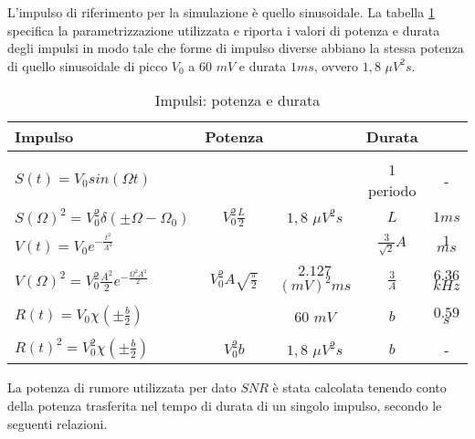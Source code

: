 L'impulso di riferimento per la simulazione è quello sinusoidale.
La tabella \ref{tab:impulsi} specifica la parametrizzazione utilizzata e riporta i valori di potenza e durata degli impulsi in modo tale che forme di impulso diverse abbiano la stessa potenza di quello sinusoidale di picco $V_{0}$ a $60$ $mV$ e durata $1ms$, ovvero $1,8$ $\mu V^{2}s$.


\begin{table}%
\begin{tabular}{l|c|c|c|c|}
{\bf Impulso}   & Potenza &  & Durata &  \\ \hline

& & & &     \\

$S(t)  = V_{0}sin(\Omega t)$
&   & 
& 1 periodo  &  - \\

$S(\Omega)^{2}  = V_{0}^{2}\delta(\pm \Omega - \Omega_{0})$
&  $V_{0}^{2}\frac{L}{2}$ & $1,8$ $\mu V^{2}s$
& $L$ &  $1ms$ \\   \hline


$V(t) = V_{0}e^{-\frac{t^2}{A^2}}$
&  %
& 
& $\frac{3}{\sqrt{2}}A$ & $1$ $ms$    \\

& & & &     \\

$V(\Omega)^{2} = V_{0}^{2}\frac{A^{2}}{2}e^{-\frac{\Omega^{2}A^{2}}{2}}$
&  $V_{0}^{2}A\sqrt{\frac{\pi}{2}}$ & $2.127$ $(mV)^{2}ms$
& $\frac{3}{A}$ &  $6.36$ $kHz$   \\   \hline

& & & &     \\

$R(t) = V_{0}\chi(\pm \frac{b}{2})$
&  %
& $60$ $mV$
& $b$ &  $0.59$ $s$  \\

& & & &     \\

$R(t)^{2}  = V_{0}^{2}\chi(\pm \frac{b}{2})$
&  $V_{0}^{2}b$ & $1,8$ $\mu V^{2}s$
& $b$ &  - \\

\hline

\end{tabular}
\caption[Impulsi: potenza e durata]
{Impulsi: potenza e durata}
\label{tab:impulsi}
\end{table}


La potenza di rumore utilizzata per dato $SNR$ è stata calcolata tenendo conto della potenza trasferita nel tempo di durata di un singolo impulso, secondo le seguenti relazioni.


